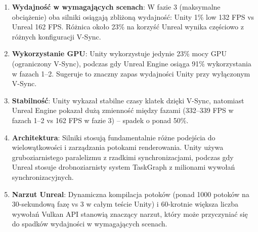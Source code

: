 \begin{enumerate}
    \item \textbf{Wydajność w wymagających scenach}: W fazie 3 (maksymalne obciążenie)
    oba silniki osiągają zbliżoną wydajność: Unity 1\% low 132 FPS vs Unreal 162 FPS. Różnica
    około 23\% na korzyść Unreal wynika częściowo z różnych konfiguracji V-Sync.

    \item \textbf{Wykorzystanie GPU}: Unity wykorzystuje jedynie 23\% mocy GPU 
    \\ (ograniczony V-Sync),
    podczas gdy Unreal Engine osiąga 91\% wykorzystania w fazach 1--2. Sugeruje to znaczny
    zapas wydajności Unity przy wyłączonym V-Sync.

    \item \textbf{Stabilność}: Unity wykazał stabilne czasy klatek dzięki 
    V-Sync, natomiast
    Unreal Engine pokazał dużą zmienność między fazami (332--339 FPS w fazach 1--2 vs 162 FPS
    w fazie 3) -- spadek o ponad 50\%.

    \item \textbf{Architektura}: Silniki stosują fundamentalnie różne podejścia do
    wielowątkowości i zarządzania potokami renderowania. Unity używa gruboziarnistego paralelizmu
    z rzadkimi synchronizacjami, podczas gdy Unreal stosuje drobnoziarnisty system TaskGraph
    z milionami wywołań synchronizacyjnych.

    \item \textbf{Narzut Unreal}: Dynamiczna kompilacja potoków (ponad 1000 potoków na
    \\ 30-sekundową fazę vs 3 w całym teście Unity) i 60-krotnie większa liczba wywołań Vulkan API
    stanowią znaczący narzut, który może przyczyniać się do spadków wydajności w wymagających scenach.
\end{enumerate}
